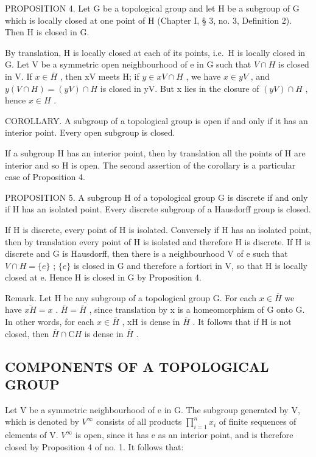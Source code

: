 PROPOSITION 4. Let G be a topological group and let H be a subgroup of G which is locally closed at one point of H (Chapter I, § 3, no. 3, Definition 2). Then H is closed in G.

By translation, H is locally closed at each of its points, i.e.~H is locally closed in G. Let V be a symmetric open neighbourhood of e in G such that \(V \cap H\) is closed in V. If \(x \in \overline{H}\) , then xV meets H; if \(y \in xV \cap H\) , we have \(x \in yV\) , and \(y(V \cap H) = (yV) \cap H\) is closed in yV. But x lies in the closure of \((yV) \cap H\) , hence \(x \in H\) .

COROLLARY. A subgroup of a topological group is open if and only if it has an interior point. Every open subgroup is closed.

If a subgroup H has an interior point, then by translation all the points of H are interior and so H is open. The second assertion of the corollary is a particular case of Proposition 4.

PROPOSITION 5. A subgroup H of a topological group G is discrete if and only if H has an isolated point. Every discrete subgroup of a Hausdorff group is closed.

If H is discrete, every point of H is isolated. Conversely if H has an isolated point, then by translation every point of H is isolated and therefore H is discrete. If H is discrete and G is Hausdorff, then there is a neighbourhood V of e such that \(V \cap H = \{e\}\) ; \(\{e\}\) is closed in G and therefore a fortiori in V, so that H is locally closed at e. Hence H is closed in G by Proposition 4.

Remark. Let H be any subgroup of a topological group G. For each \(x \in \overline{H}\) we have \(\overline{xH} = x\) . \(\overline{H} = \overline{H}\) , since translation by x is a homeomorphism of G onto G. In other words, for each \(x \in \overline{H}\) , xH is dense in \(\overline{H}\) . It follows that if H is not closed, then \(\overline{H} \cap \mathrm{C}H\) is dense in \(\overline{H}\) .

\subsection{COMPONENTS OF A TOPOLOGICAL GROUP}

Let V be a symmetric neighbourhood of e in G. The subgroup generated by V, which is denoted by \(V^{\infty}\) consists of all products \(\prod_{i=1}^{n} x_{i}\) of finite sequences of elements of V. \(V^{\infty}\) is open, since it has e as an interior point, and is therefore closed by Proposition 4 of no. 1. It follows that:


